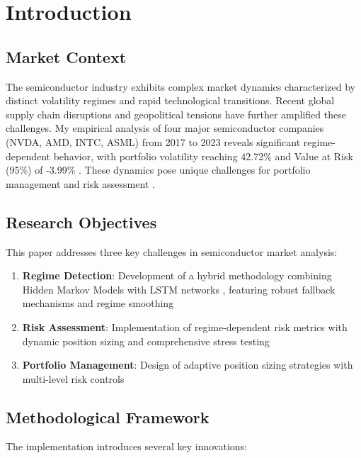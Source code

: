 \section{Introduction}

\subsection{Market Context}
The semiconductor industry exhibits complex market dynamics characterized by distinct volatility regimes and rapid technological transitions. Recent global supply chain disruptions and geopolitical tensions have further amplified these challenges. My empirical analysis of four major semiconductor companies (NVDA, AMD, INTC, ASML) from 2017 to 2023 reveals significant regime-dependent behavior, with portfolio volatility reaching 42.72\% and Value at Risk (95\%) of -3.99\% \citep{alexander2008market}. These dynamics pose unique challenges for portfolio management and risk assessment \citep{mcneil2015quantitative}.

\subsection{Research Objectives}
This paper addresses three key challenges in semiconductor market analysis:

\begin{enumerate}
    \item \textbf{Regime Detection}: Development of a hybrid methodology combining Hidden Markov Models \citep{hamilton1989new} with LSTM networks \citep{fischer2018deep}, featuring robust fallback mechanisms and regime smoothing
    \item \textbf{Risk Assessment}: Implementation of regime-dependent risk metrics with dynamic position sizing and comprehensive stress testing \citep{mcneil2000estimation}
    \item \textbf{Portfolio Management}: Design of adaptive position sizing strategies with multi-level risk controls \citep{ang2002regime}
\end{enumerate}

\subsection{Methodological Framework}
The implementation introduces several key innovations:

